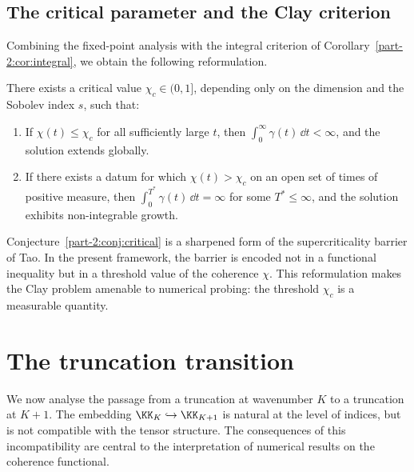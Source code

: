 \subsection{The critical parameter and the Clay criterion}
\label{part-2:ssec:critical-param}

Combining the fixed-point analysis with the integral criterion of 
Corollary~\ref{part-2:cor:integral}, we obtain the following reformulation.

\begin{conjecture}\label{part-2:conj:critical}
There exists a critical value $\chi_c\in(0,1]$, depending only on the 
dimension and the Sobolev index $s$, such that:
\begin{enumerate}[label=(\roman*),leftmargin=*]
\item If $\chi(t)\leq\chi_c$ for all sufficiently large $t$, then 
      $\int_0^\infty\gamma(t)\,\dd t<\infty$, and the solution extends 
      globally.
\item If there exists a datum for which $\chi(t)>\chi_c$ on an open 
      set of times of positive measure, then 
      $\int_0^{T^\ast}\gamma(t)\,\dd t=\infty$ for some $T^\ast\leq\infty$, 
      and the solution exhibits non-integrable growth.
\end{enumerate}
\end{conjecture}

\begin{remark}\label{part-2:rem:conj-critical}
Conjecture~\ref{part-2:conj:critical} is a sharpened form of the 
supercriticality barrier of Tao. In the present framework, the barrier 
is encoded not in a functional inequality but in a threshold value of 
the coherence $\chi$. This reformulation makes the Clay problem 
amenable to numerical probing: the threshold $\chi_c$ is a measurable 
quantity.
\end{remark}

\section{The truncation transition}
\label{part-2:sec:transition}

We now analyse the passage from a truncation at wavenumber $K$ to a 
truncation at $K+1$. The embedding $\KK_K\hookrightarrow\KK_{K+1}$ is 
natural at the level of indices, but is not compatible with the 
tensor structure. The consequences of this incompatibility are 
central to the interpretation of numerical results on the coherence 
functional.

